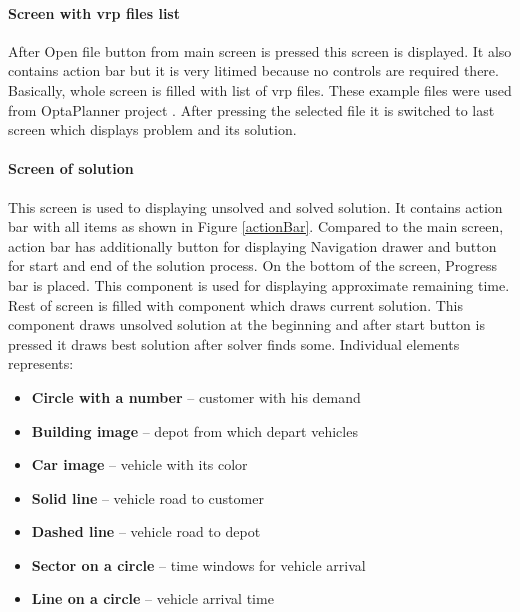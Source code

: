 \paragraph{Screen with vrp files list} After Open file button from main screen is pressed this screen is displayed. It
also contains action bar but it is very litimed because no controls are required there. Basically, whole screen is
filled with list of vrp files. These example files were used from OptaPlanner project \cite{OptaPlannerPages}. After
pressing the selected file it is switched to last screen which displays problem and its solution.

\paragraph{Screen of solution}
This screen is used to displaying unsolved and solved solution. It contains action bar with all items as shown in Figure
\ref{actionBar}. Compared to the main screen, action bar has additionally button for displaying Navigation drawer and
button for start and end of the solution process. On the bottom of the screen, Progress bar is placed. This component
is used for displaying approximate remaining time. Rest of screen is filled with component which draws current solution.
This component draws unsolved solution at the beginning and after start button is pressed it draws best solution after
solver finds some. Individual elements represents:

\begin{itemize}
  \item \textbf{Circle with a number} -- customer with his demand
  \item \textbf{Building image} -- depot from which depart vehicles
  \item \textbf{Car image} -- vehicle with its color
  \item \textbf{Solid line} -- vehicle road to customer
  \item \textbf{Dashed line} -- vehicle road to depot
  \item \textbf{Sector on a circle} -- time windows for vehicle arrival
  \item \textbf{Line on a circle} -- vehicle arrival time
\end{itemize}


